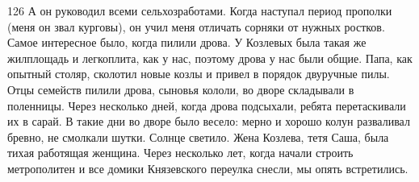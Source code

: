126
А он руководил всеми сельхозработами. Когда наступал период прополки (меня он звал курговы), он учил меня отличать сорняки от нужных ростков. Самое интересное было, когда пилили дрова. У Козлевых была такая же жилплощадь и легкоплита, как у нас, поэтому дрова у нас были общие. Папа, как опытный столяр, сколотил новые козлы и привел в порядок двуручные пилы. Отцы семейств пилили дрова, сыновья кололи, во дворе складывали в поленницы. Через несколько дней, когда дрова подсыхали, ребята перетаскивали их в сарай. В такие дни во дворе было весело: мерно и хорошо колун разваливал бревно, не смолкали шутки. Солнце светило. Жена Козлева, тетя Саша, была тихая работящая женщина. Через несколько лет, когда начали строить метрополитен и все домики Князевского переулка снесли, мы опять встретились.
